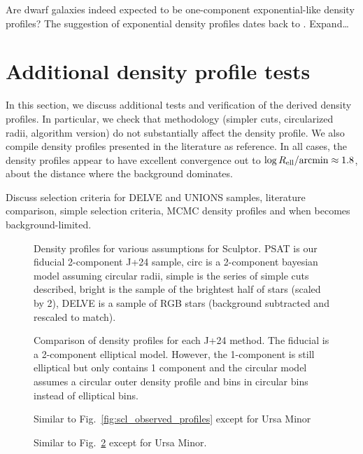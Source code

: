 Are dwarf galaxies indeed expected to be one-component exponential-like
density profiles? The suggestion of exponential density profiles dates
back to \citet{faber+lin1983}. Expand\ldots{}

\section{Additional density profile
tests}\label{additional-density-profile-tests}

In this section, we discuss additional tests and verification of the
derived density profiles. In particular, we check that methodology
(simpler cuts, circularized radii, algorithm version) do not
substantially affect the density profile. We also compile density
profiles presented in the literature as reference. In all cases, the
density profiles appear to have excellent convergence out to
\(\log R_{\rm ell} / {\rm arcmin} \approx 1.8\), about the distance
where the background dominates.

Discuss selection criteria for DELVE and UNIONS samples, literature
comparison, simple selection criteria, MCMC density profiles and when
\citet{jensen+2024} becomes background-limited.

\begin{figure}
\centering
{}
\caption[Density profiles]{Density profiles for various assumptions for
Sculptor. PSAT is our fiducial 2-component J+24 sample, circ is a
2-component bayesian model assuming circular radii, simple is the series
of simple cuts described, bright is the sample of the brightest half of
stars (scaled by 2), DELVE is a sample of RGB stars (background
subtracted and rescaled to match).}\label{fig:scl_density_extras}
\end{figure}

\begin{figure}
\centering
{}
\caption[Density profiles]{Comparison of density profiles for each J+24
method. The fiducial is a 2-component elliptical model. However, the
1-component is still elliptical but only contains 1 component and the
circular model assumes a circular outer density profile and bins in
circular bins instead of elliptical
bins.}\label{fig:scl_density_j24_methods}
\end{figure}

\begin{figure}
\centering
{}
\caption[UMi Density profiles]{Similar to
Fig.~\ref{fig:scl_observed_profiles} except for Ursa
Minor}\label{fig:umi_density_extras}
\end{figure}

\begin{figure}
\centering
{}
\caption[UMi density methods]{Similar to
Fig.~\ref{fig:scl_density_j24_methods} except for Ursa
Minor.}\label{fig:umi_density_j24_methods}
\end{figure}
